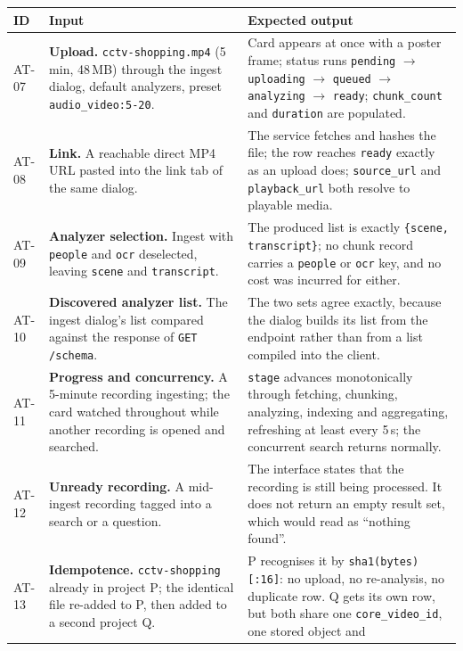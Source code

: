 \documentclass[11pt,a4paper]{article}
\begin{document}
\begin{table}[htbp]
\centering
\scriptsize
\begin{tabularx}{\textwidth}{@{}L{0.85cm}XX@{}}
\toprule
\textbf{ID} & \textbf{Input} & \textbf{Expected output} \\
\midrule
AT-07 & \textbf{Upload.} \texttt{cctv-shopping.mp4} (5 min, 48\,MB) through the ingest
dialog, default analyzers, preset \texttt{audio\_video:5-20}. &
Card appears at once with a poster frame; status runs \texttt{pending} $\to$
\texttt{uploading} $\to$ \texttt{queued} $\to$ \texttt{analyzing} $\to$ \texttt{ready};
\texttt{chunk\_count} and \texttt{duration} are populated. \\
AT-08 & \textbf{Link.} A reachable direct MP4 URL pasted into the link tab of the same
dialog. &
The service fetches and hashes the file; the row reaches \texttt{ready} exactly as an
upload does; \texttt{source\_url} and \texttt{playback\_url} both resolve to playable
media. \\
AT-09 & \textbf{Analyzer selection.} Ingest with \texttt{people} and \texttt{ocr}
deselected, leaving \texttt{scene} and \texttt{transcript}. &
The produced list is exactly \texttt{\{scene, transcript\}}; no chunk record carries a
\texttt{people} or \texttt{ocr} key, and no cost was incurred for either. \\
AT-10 & \textbf{Discovered analyzer list.} The ingest dialog's list compared against the
response of \texttt{GET /schema}. &
The two sets agree exactly, because the dialog builds its list from the endpoint rather
than from a list compiled into the client. \\
AT-11 & \textbf{Progress and concurrency.} A 5-minute recording ingesting; the card watched
throughout while another recording is opened and searched. &
\texttt{stage} advances monotonically through fetching, chunking, analyzing, indexing and
aggregating, refreshing at least every 5\,s; the concurrent search returns normally. \\
AT-12 & \textbf{Unready recording.} A mid-ingest recording tagged into a search or a
question. &
The interface states that the recording is still being processed. It does not return an
empty result set, which would read as ``nothing found''. \\
AT-13 & \textbf{Idempotence.} \texttt{cctv-shopping} already in project P; the identical
file re-added to P, then added to a second project Q. &
P recognises it by \texttt{sha1(bytes)[:16]}: no upload, no re-analysis, no duplicate
row. Q gets its own row, but both share one \texttt{core\_video\_id}, one stored object and

\end{tabularx}
\end{table}
\end{document}
